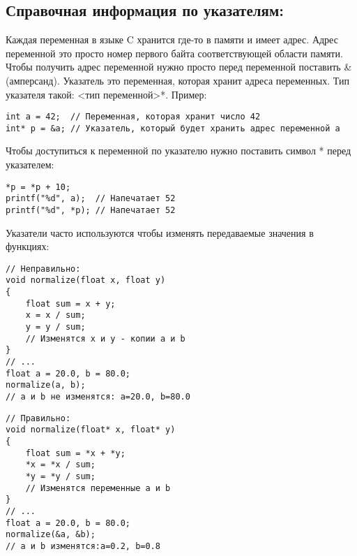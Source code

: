 \documentclass{article}
\begin{document}
\subsection*{Справочная информация по указателям:}
Каждая переменная в языке C хранится где-то в памяти и имеет адрес. Адрес переменной это просто номер первого байта соответствующей области памяти. Чтобы получить адрес переменной нужно просто перед переменной поставить \&(амперсанд).
Указатель это переменная, которая хранит адреса переменных. Тип указателя такой: <тип переменной>*. Пример:
\begin{verbatim}
int a = 42;  // Переменная, которая хранит число 42
int* p = &a; // Указатель, который будет хранить адрес переменной a
\end{verbatim}
Чтобы доступиться к переменной по указателю нужно поставить символ * перед указателем:
\begin{verbatim}
*p = *p + 10;
printf("%d", a);  // Напечатает 52
printf("%d", *p); // Напечатает 52
\end{verbatim}
Указатели часто используются чтобы изменять передаваемые значения в функциях:
\begin{multicols}{2}
\begin{verbatim}
// Неправильно:
void normalize(float x, float y)
{
    float sum = x + y;
    x = x / sum;
    y = y / sum; 
    // Изменятся x и y - копии a и b
}
// ...
float a = 20.0, b = 80.0;
normalize(a, b);
// a и b не изменятся: a=20.0, b=80.0
\end{verbatim}
\begin{verbatim}
// Правильно:
void normalize(float* x, float* y)
{
    float sum = *x + *y;
    *x = *x / sum;
    *y = *y / sum; 
    // Изменятся переменные a и b
}
// ...
float a = 20.0, b = 80.0;
normalize(&a, &b);
// a и b изменятся:a=0.2, b=0.8
\end{verbatim}
\end{multicols}
\end{document}
